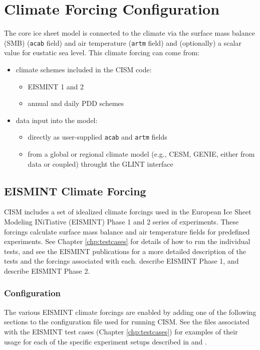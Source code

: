 \section{Climate Forcing Configuration}
The core ice sheet model is connected to the climate via the surface mass balance (SMB) (\texttt{acab} field) 
and air temperature (\texttt{artm} field) and (optionally) a scalar value for eustatic sea level. 
This climate forcing can come from:
\begin{itemize}
  \item  climate schemes included in the CISM code:
    \begin{itemize}
      \item EISMINT 1 and 2
      \item annual and daily PDD schemes
    \end{itemize}

  \item  data input into the model:
    \begin{itemize}
      \item directly as user-supplied \texttt{acab} and \texttt{artm} fields
      \item from a global or regional climate model (e.g., CESM, GENIE, either from data or coupled) throught the GLINT interface
    \end{itemize}
\end{itemize}



%
\subsection{EISMINT Climate Forcing}\label{driver:eismint}
CISM includes a set of idealized climate forcings used in the 
European Ice Sheet Modeling INiTiative (EISMINT) Phase 1 and 2
series of experiments.  These forcings calculate surface mass balance and 
air temperature fields for predefined experiments.  See Chapter \ref{chp:testcases}
for details of how to run the individual tests, and see the EISMINT publications
for a more detailed description of the tests and the forcings associated with each.
\citet{Huybrechts1996} describe EISMINT Phase 1, and \citet{Payne2000} describe EISMINT Phase 2.

\subsubsection{Configuration}
The various EISMINT climate forcings are enabled by adding one of the following
sections to the configuration file used for running CISM.  See the files associated
with the EISMINT test cases (Chapter \ref{chp:testcases}) for examples of their usage
for each of the specific experiment setups described in \citet{Huybrechts1996} and \citet{Payne2000}.

